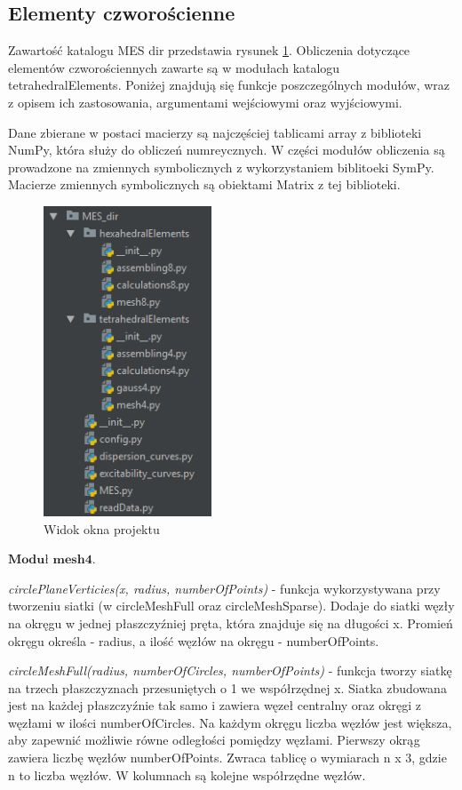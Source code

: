
\subsection{Elementy czworościenne}
\label{cha:elementy czworościenne}

Zawartość katalogu MES dir przedstawia rysunek \ref{fig:okno_projektu_MES}. Obliczenia dotyczące elementów czworościennych zawarte są w modułach katalogu tetrahedralElements. Poniżej znajdują się funkcje poszczególnych modułów, wraz z opisem ich zastosowania, argumentami wejściowymi oraz wyjściowymi.

Dane zbierane w postaci macierzy są najczęściej tablicami array z biblioteki NumPy, która służy do obliczeń numreycznych. W części modułów obliczenia są prowadzone na zmiennych symbolicznych z wykorzystaniem biblitoeki SymPy. Macierze zmiennych symbolicznych są obiektami Matrix z tej biblioteki.

\begin{figure}[h]
\centering
\includegraphics[width=5cm]{Zdjecia/5/okno_projektu_MES}
\caption{Widok okna projektu}
\label{fig:okno_projektu_MES}
\end{figure}

\vspace {3mm}
 \( \textbf{Moduł mesh4} \).

\vspace {3mm}
\textit{circlePlaneVerticies(x, radius, numberOfPoints)} - funkcja wykorzystywana przy tworzeniu siatki (w circleMeshFull oraz circleMeshSparse). Dodaje do siatki węzły na okręgu w jednej płaszczyźniej pręta, która znajduje się na długości x. Promień okręgu określa - radius, a ilość węzłów na okręgu - numberOfPoints.

\vspace {3mm}
\textit{circleMeshFull(radius, numberOfCircles, numberOfPoints)} - funkcja tworzy siatkę na trzech płaszczyznach przesuniętych o 1 we współrzędnej x. Siatka zbudowana jest na każdej płaszczyźnie tak samo i zawiera węzeł centralny oraz okręgi z węzłami w ilości numberOfCircles. Na każdym okręgu liczba węzłów jest większa, aby zapewnić możliwie równe odległości pomiędzy węzłami. Pierwszy okrąg zawiera liczbę węzłów numberOfPoints. Zwraca tablicę o wymiarach n x 3, gdzie n to liczba węzłów. W kolumnach są kolejne współrzędne węzłów.

